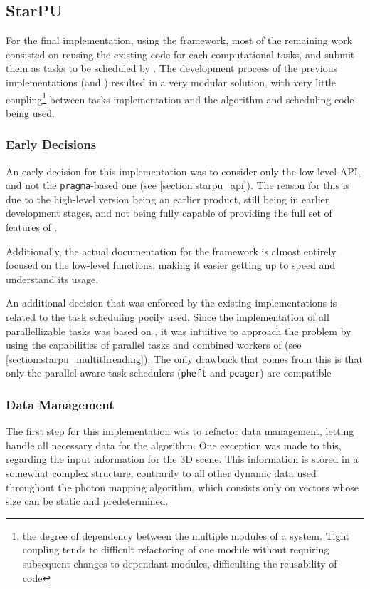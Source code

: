 \documentclass[main.tex]{subfiles}
\begin{document}
\subsection{StarPU} \label{section:impl_starpu}

For the final implementation, using the \starpu framework, most of the remaining work consisted on reusing the existing code for each computational tasks, and submit them as tasks to be scheduled by \starpu. The development process of the previous implementations (\cpu and \cuda) resulted in a very modular solution, with very little coupling\footnote{the degree of dependency between the multiple modules of a system. Tight coupling tends to difficult refactoring of one module without requiring subsequent changes to dependant modules, difficulting the reusability of code} between tasks implementation and the algorithm and scheduling code being used.

\subsubsection{Early Decisions}

An early decision for this implementation was to consider only the low-level API, and not the \texttt{pragma}-based one (see \cref{section:starpu_api}). The reason for this is due to the high-level version being an earlier product, still being in earlier development stages, and not being fully capable of providing the full set of features of \starpu.

Additionally, the actual documentation for the framework is almost entirely focused on the low-level functions, making it easier getting up to speed and understand its usage.

An additional decision that was enforced by the existing implementations is related to the task scheduling pocily used. Since the \cpu implementation of all parallellizable tasks was based on \openmp, it was intuitive to approach the problem by using the capabilities of parallel tasks and combined workers of \starpu (see \cref{section:starpu_multithreading}). The only drawback that comes from this is that only the parallel-aware task schedulers (\texttt{pheft} and \texttt{peager}) are compatible

\subsubsection{Data Management}

The first step for this implementation was to refactor data management, letting \starpu handle all necessary data for the algorithm. One exception was made to this, regarding the input information for the 3D scene. This information is stored in a somewhat complex structure, contrarily to all other dynamic data used throughout the photon mapping algorithm, which consists only on vectors whose size can be static and predetermined.
\end{document}
